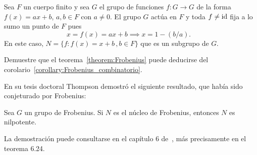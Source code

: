 \begin{example}
  Sea $F$ un cuerpo finito y sea $G$ el grupo de funciones $f\colon G\to G$ de
  la forma $f(x)=ax+b$, $a,b\in F$ con $a\ne0$. El grupo $G$ actúa en $F$ y toda
  $f\ne\operatorname{id}$ fija a lo sumo un punto de $F$ pues 
  \[
	x=f(x)=ax+b\implies x=1-(b/a).
  \]
  En este caso, $N=\{f:f(x)=x+b\,,b\in F\}$ que es
  un subgrupo de $G$.
\end{example}

\begin{exercise}
  Demuestre que el teorema~\ref{theorem:Frobenius} puede deducirse del
  corolario~\ref{corollary:Frobenius_combinatorio}.
\end{exercise}



En su tesis doctoral Thompson demostró el siguiente resultado, que había sido conjeturado por Frobenius:

\begin{theorem}[Thompson]
Sea $G$ un grupo de Frobenius. Si $N$ es el núcleo de Frobenius, entonces $N$ es nilpotente. 
\end{theorem}

La demostración puede consultarse en el capítulo 6 
de~\cite{MR2426855}, más precisamente en el teorema 6.24. 